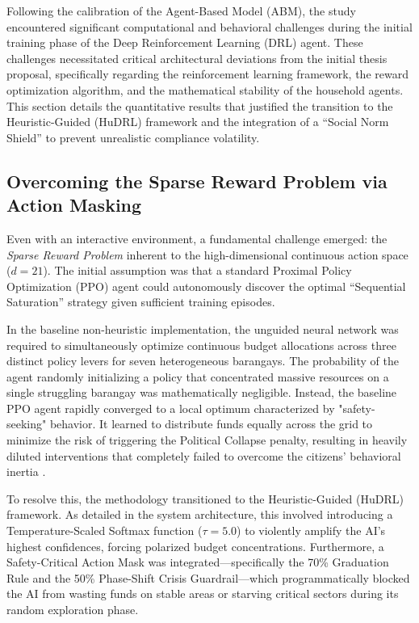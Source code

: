 Following the calibration of the Agent-Based Model (ABM), the study encountered significant computational and behavioral challenges during the initial training phase of the Deep Reinforcement Learning (DRL) agent. These challenges necessitated critical architectural deviations from the initial thesis proposal, specifically regarding the reinforcement learning framework, the reward optimization algorithm, and the mathematical stability of the household agents. This section details the quantitative results that justified the transition to the Heuristic-Guided (HuDRL) framework and the integration of a ``Social Norm Shield'' to prevent unrealistic compliance volatility.

\subsection{Overcoming the Sparse Reward Problem via Action Masking}
Even with an interactive environment, a fundamental challenge emerged: the \textit{Sparse Reward Problem} inherent to the high-dimensional continuous action space ($d=21$). The initial assumption was that a standard Proximal Policy Optimization (PPO) agent could autonomously discover the optimal ``Sequential Saturation'' strategy given sufficient training episodes. 

In the baseline non-heuristic implementation, the unguided neural network was required to simultaneously optimize continuous budget allocations across three distinct policy levers for seven heterogeneous barangays. The probability of the agent randomly initializing a policy that concentrated massive resources on a single struggling barangay was mathematically negligible. Instead, the baseline PPO agent rapidly converged to a local optimum characterized by "safety-seeking" behavior. It learned to distribute funds equally across the grid to minimize the risk of triggering the Political Collapse penalty, resulting in heavily diluted interventions that completely failed to overcome the citizens' behavioral inertia \citep{ZhengAI2022}. 

To resolve this, the methodology transitioned to the Heuristic-Guided (HuDRL) framework. As detailed in the system architecture, this involved introducing a Temperature-Scaled Softmax function ($\tau=5.0$) to violently amplify the AI's highest confidences, forcing polarized budget concentrations. Furthermore, a Safety-Critical Action Mask was integrated—specifically the 70\% Graduation Rule and the 50\% Phase-Shift Crisis Guardrail—which programmatically blocked the AI from wasting funds on stable areas or starving critical sectors during its random exploration phase.

